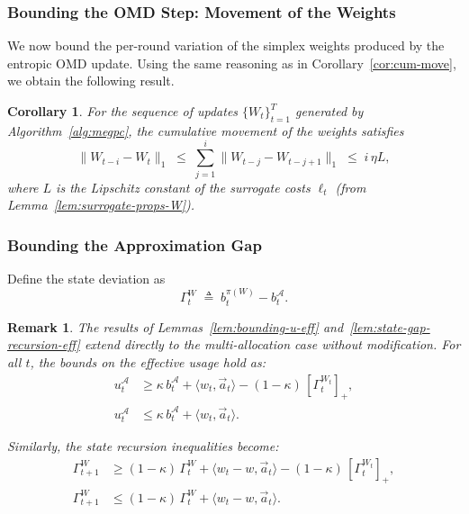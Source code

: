\documentclass[11pt]{article}
\newtheorem{Thm:Corollary}{Corollary}
\newtheorem{Thm:Remark}{Remark}
\begin{document}
\subsubsection{Bounding the OMD Step: Movement of the Weights}

We now bound the per-round variation of the simplex weights produced by the entropic OMD update.  
Using the same reasoning as in Corollary~\ref{cor:cum-move}, we obtain the following result.

\begin{Thm:Corollary}\label{cor:cum-move-W}
For the sequence of updates \(\{W_t\}_{t=1}^T\) generated by Algorithm~\ref{alg:megpc},  
the cumulative movement of the weights satisfies
\[
\|W_{t-i} - W_t\|_1
\;\le\;
\sum_{j=1}^i \|W_{t-j} - W_{t-j+1}\|_1
\;\le\;
i\,\eta L,
\]
where \(L\) is the Lipschitz constant of the surrogate costs \(\ell_t\) (from Lemma~\ref{lem:surrogate-props-W}).  
\end{Thm:Corollary}

\subsubsection{Bounding the Approximation Gap}

Define the state deviation as
\[
\Gamma_t^{W} \;\triangleq\; b_t^{\pi(W)} - b_t^{\mathcal{A}}.
\]

\begin{Thm:Remark}
The results of Lemmas~\ref{lem:bounding-u-eff} and~\ref{lem:state-gap-recursion-eff} extend directly to the multi-allocation case without modification.  
For all \(t\), the bounds on the effective usage hold as:
\begin{align}
\label{eq:u-lower-bound-eff-W}
u_t^{\mathcal{A}}
&\ge
\kappa\, b_t^{\mathcal{A}} + \langle w_t, \vec{a}_t \rangle
- (1-\kappa)\,[\Gamma_t^{W_t}]_+, \\[4pt]
\label{eq:u-upper-bound-eff-W}
u_t^{\mathcal{A}}
&\le
\kappa\, b_t^{\mathcal{A}} + \langle w_t, \vec{a}_t \rangle.
\end{align}

Similarly, the state recursion inequalities become:
\begin{align}
\label{eq:GAMMA-Lower-W}
\Gamma_{t+1}^{W}
&\ge
(1-\kappa)\,\Gamma_t^{W}
+ \langle w_t - w, \vec{a}_t \rangle
- (1-\kappa)\,[\Gamma_t^{W_t}]_+, \\[4pt]
\label{eq:GAMMA-Upper-W}
\Gamma_{t+1}^{W}
&\le
(1-\kappa)\,\Gamma_t^{W}
+ \langle w_t - w, \vec{a}_t \rangle.
\end{align}

\end{Thm:Remark}
\end{document}
